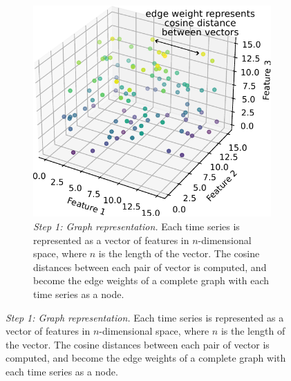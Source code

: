 \begin{figure}
  \centering
  \begin{subfigure}[t]{0.7\textwidth}
  \centering
    \includegraphics[width=\linewidth]{graph_representation}
    \caption{
      \emph{Step 1: Graph representation.}
      Each time series is represented as a vector of features in $n$-dimensional space, where $n$ is the length of the vector.
      The cosine distances between each pair of vector is computed, and become the edge weights of a complete graph with each time series as a node.
    }
    \label{fig:analysis-clustering-modclust-graph}
  \end{subfigure}


\end{figure}
